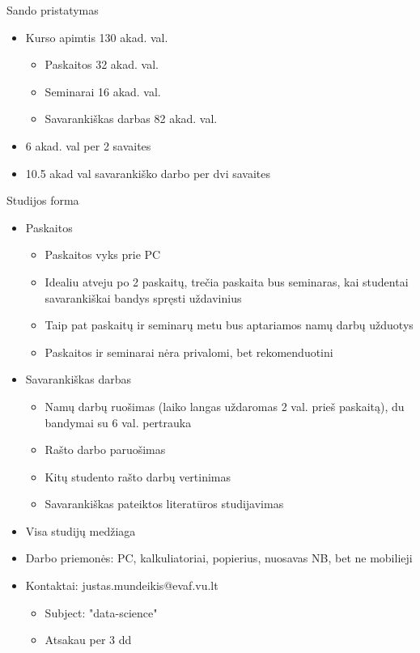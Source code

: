 \documentclass[11pt,xcolor=table]{beamer}
\begin{document}
\begin{frame}{Sando pristatymas}
\begin{itemize}
\item Kurso apimtis 130 akad. val.
\begin{itemize}
\item Paskaitos 32 akad. val.
\item Seminarai 16 akad. val.
\item Savarankiškas darbas 82 akad. val.
\end{itemize}
\item 6 akad. val per 2 savaites
\item 10.5 akad val savarankiško darbo per dvi savaites
\end{itemize}
\end{frame}

\begin{frame}{Studijos forma}
\begin{itemize}
\item Paskaitos
\begin{itemize}
\item Paskaitos vyks prie PC
\item Idealiu atveju po 2 paskaitų, trečia paskaita bus seminaras, kai studentai savarankiškai bandys spręsti uždavinius
\item Taip pat paskaitų ir seminarų metu bus aptariamos namų darbų užduotys
\item Paskaitos ir seminarai nėra privalomi, bet rekomenduotini
\end{itemize}
\item Savarankiškas darbas
\begin{itemize}
\item Namų darbų ruošimas (laiko langas uždaromas 2 val. prieš paskaitą), du bandymai su 6 val. pertrauka
\item Rašto darbo paruošimas
\item Kitų studento rašto darbų vertinimas
\item Savarankiškas pateiktos literatūros studijavimas
\end{itemize}
\end{itemize}
\end{frame}


\begin{frame}
\begin{itemize}
\item Visa studijų medžiaga \href{https://github.com/justasmundeikis/duomenu_analizes_ivadas}{\color{blue}{Github}}
\item Darbo priemonės: PC, kalkuliatoriai, popierius, nuosavas NB, bet ne mobilieji
\item Kontaktai: justas.mundeikis@evaf.vu.lt
\begin{itemize}
\item Subject: "data-science"
\item Atsakau per 3 dd
\end{itemize}
\end{itemize}
\end{frame}
\end{document}
